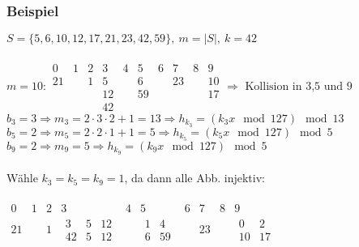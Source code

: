                     \subsubsection{Beispiel}
                    	$S = \{ 5, 6, 10, 12, 17, 21, 23, 42, 59\},\ m = |S|,\ k = 42$\\\\
					\begin{math}
						m=10:
						\begin{array}{c|c|c|c|c|c|c|c|c|c}
							0 & 1 & 2 & 3 & 4 & 5 & 6 & 7 & 8 & 9\\\hline
							21&   & 1 & 5 &   & 6 &   & 23&   &10\\
							  &   &   &12 &   &59 &   &   &   &17\\
							  &   &   &42 &   &   &   &   &   &
						\end{array}
						\Rightarrow \text{ Kollision in 3,5 und 9}
					\end{math}\\
					$b_3=3 \Rightarrow m_3=2\cdot 3\cdot 2 +1 = 13 \Rightarrow h_{k_3}= (k_3 x \mod 127)\mod 13$\\
					$b_5=2 \Rightarrow m_5=2\cdot 2\cdot1 +1 =5 \Rightarrow h_{k_5}= (k_5 x \mod 127)\mod 5$\\
					$b_9=2 \Rightarrow m_9=5 \Rightarrow h_{k_9}= (k_9 x \mod 127)\mod 5$\\\\
					Wähle $k_3=k_5=k_9=1$, da dann alle Abb. injektiv:\\\\
					\begin{math}
						\begin{array}{c|c|c|c|c|c|c|c|c|c}
							0 & 1 & 2 & 3 & 4 & 5 & 6 & 7 & 8 & 9\\\hline
							21&   & 1 & 
							\begin{array}{|c|c|c|}
								3 & 5 & 12\\\hline
								42& 5 & 12
							\end{array}
									 &   & 
									\begin{array}{|c|c|}
										 1&4\\\hline
										 6&59				 
									\end{array}&   & 23&   &
									\begin{array}{|c|c|}
										0&2\\\hline
										10&17				
									\end{array}
						\end{array}
					\end{math}
                    
